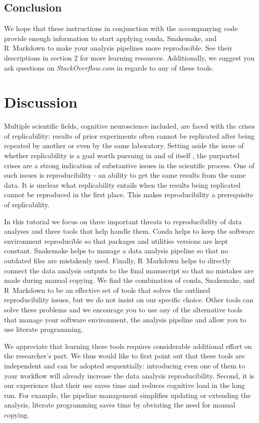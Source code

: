 \documentclass[a4paper,man,floatsintext,natbib]{apa6}
\begin{document}
\subsection{Conclusion}
We hope that these instructions in conjunction with the accompanying code provide enough information to start applying conda, Snakemake, and R~Markdown to make your analysis pipelines more reproducible. See their descriptions in section 2 for more learning resources. Additionally, we suggest you ask questions on \emph{StackOverflow.com} in regards to any of these tools.

\section{Discussion}
Multiple scientific fields, cognitive neuroscience included, are faced with the crises of replicability: results of prior experiments often cannot be replicated after being repeated by another or even by the same laboratory. Setting aside the issue of whether replicability is a goal worth pursuing in and of itself \citep{devezerCaseFormalMethodology2021}, the purported crises are a strong indication of substantive issues in the scientific process. One of such issues is reproducibility - an ability to get the same results from the same data. It is unclear what replicability entails when the results being replicated cannot be reproduced in the first place. This makes reproducibility a prerequisite of replicability.

In this tutorial we focus on three important threats to reproducibility of data analyses and three tools that help handle them. Conda helps to keep the software environment reproducible so that packages and utilities versions are kept constant. Snakemake helps to manage a data analysis pipeline so that no outdated files are mistakenly used. Finally, R~Markdown helps to directly connect the data analysis outputs to the final manuscript so that no mistakes are made during manual copying. We find the combination of conda, Snakemake, and R~Markdown to be an effective set of tools that solves the outlined reproducibility issues, but we do not insist on our specific choice. Other tools can solve these problems and we encourage you to use any of the alternative tools that manage your software environment, the analysis pipeline and allow you to use literate programming.

We appreciate that learning these tools requires considerable additional effort on the researcher's part. We thus would like to first point out that these tools are independent and can be adopted sequentially: introducing even one of them to your workflow will already increase the data analysis reproducibility. Second, it is our experience that their use saves time and reduces cognitive load in the long run.
For example, the pipeline management simplifies updating or extending the analysis, literate programming saves time by obviating the need for manual copying.
\end{document}
